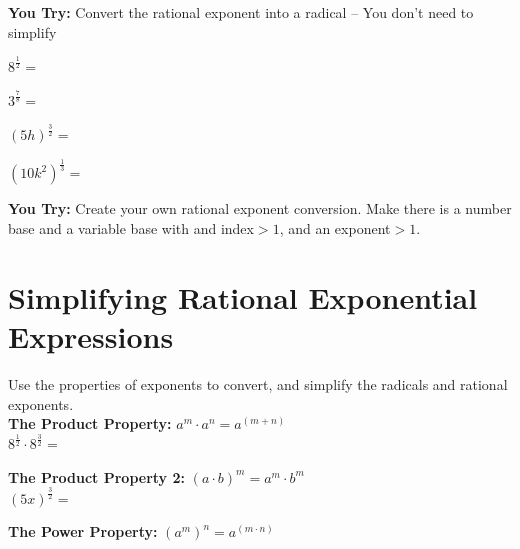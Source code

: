 \documentclass[12pt]{article}
\begin{document}
\hrulefill

\textbf{You Try:} Convert the rational exponent into a radical -- You don't need to simplify

\begin{enumerate}[resume]
\begin{multicols}{2}
\setlength\itemsep{1cm}
\item $8^{\frac{1}{2}}=$

\item $3^{\frac{7}{8}}=$

\item $(5h)^{\frac{3}{2}}=$

\item $(10k^2)^{\frac{1}{3}}=$

\end{multicols}
\end{enumerate}

\hrulefill

\textbf{You Try:} Create your own rational exponent conversion. Make there is a number base and a variable base with and index$>1$, and an exponent$>1$.





\section{Simplifying Rational Exponential Expressions}
Use the properties of exponents to convert, and simplify the radicals and rational exponents. \\

\textbf{The Product Property:} $a^m\cdot a^n=a^{(m+n)}$\\

\hspace{1in} $8^{\frac{1}{2}} \cdot  8^{\frac{3}{2}}=$\\

\vspace{1cm}

\textbf{The Product Property 2:} $(a\cdot b)^m=a^m\cdot b^m$\\

\hspace{1in}$\left(5x\right)^{\frac{3}{2}}=$\\

\vspace{1cm}

\textbf{The Power Property:} $\left(a^m\right)^{n}=a^{(m\cdot n)}$\\
\end{document}
